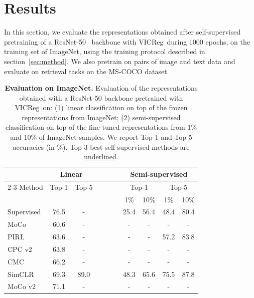 \documentclass{article} %
\newcommand{\algo}{VICReg}
\begin{document}
\section{Results}
In this section, we evaluate the representations obtained after self-supervised pretraining of a ResNet-50~\cite{he2016resnet} backbone with \algo \ during 1000 epochs, on the training set of ImageNet, using the training protocol described in section~\ref{sec:method}. We also pretrain on pairs of image and text data and evaluate on retrieval tasks on the MS-COCO dataset.
\begin{table}[t]
\setlength{\tabcolsep}{7pt}
\centering
    \caption{\textbf{Evaluation on ImageNet.} Evaluation of the representations obtained with a ResNet-50 backbone pretrained with \algo \ on: (1) linear classification on top of the frozen representations from ImageNet; (2) semi-supervised classification on top of the fine-tuned representations from 1\% and 10\% of ImageNet samples. We report Top-1 and Top-5 accuracies (in \%). Top-3 best self-supervised methods are \underline{underlined}.}
    \label{tab:imagenet_evaluation}
    \vspace{-0.5em}
    \begin{tabular}{ @{} l cc c cccc @{} }
      \toprule
 & \multicolumn{2}{c}{Linear}  &~~~~& \multicolumn{4}{c}{Semi-supervised} \\
 \cmidrule{2-3}\cmidrule{5-8}
 Method                     & Top-1 & Top-5 && \multicolumn{2}{c}{Top-1} & \multicolumn{2}{c}{Top-5} \\
	                                            &        &        && 1\% & 10\% & 1\% & 10\% \\      
      \midrule
	    Supervised                              & 76.5 & -      && 25.4 & 56.4 & 48.4 & 80.4 \\
      \midrule
	    MoCo~\cite{he2020moco}                  & 60.6 & -      && -      & -      & -      & - \\
	    PIRL~\cite{misra2020pirl}               & 63.6 & -      && -      & -      & 57.2 & 83.8 \\
	    CPC v2 \cite{henaff2019data}            & 63.8 & -      && -      & -      & -      & - \\
	    CMC \cite{tian2019cmc}                  & 66.2 & -      && -      & -      & -      & - \\
	    SimCLR~\cite{chen2020simclr}            & 69.3 & 89.0   && 48.3 & 65.6 & 75.5 & 87.8 \\
	    MoCo v2~\cite{chen2020mocov2}           & 71.1 & -      && -      & -      & -      & - \\

\end{tabular}
\end{table}
\end{document}
